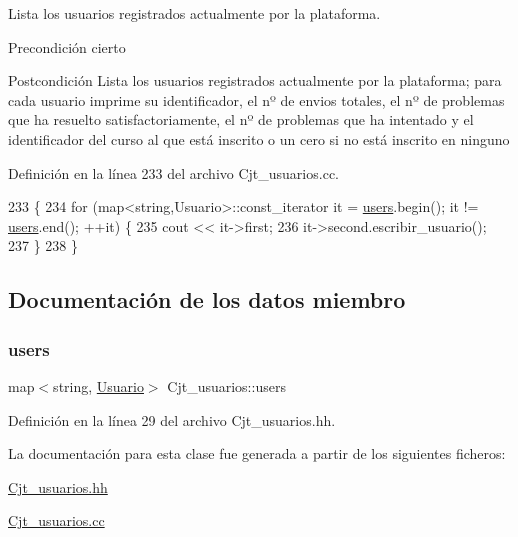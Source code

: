 Lista los usuarios registrados actualmente por la plataforma. 

\begin{DoxyPrecond}{Precondición}
cierto 
\end{DoxyPrecond}
\begin{DoxyPostcond}{Postcondición}
Lista los usuarios registrados actualmente por la plataforma; para cada usuario imprime su identificador, el nº de envios totales, el nº de problemas que ha resuelto satisfactoriamente, el nº de problemas que ha intentado y el identificador del curso al que está inscrito o un cero si no está inscrito en ninguno 
\end{DoxyPostcond}


Definición en la línea 233 del archivo Cjt\+\_\+usuarios.\+cc.


\begin{DoxyCode}
233                                                \{
234         \textcolor{keywordflow}{for} (map<string,Usuario>::const\_iterator it = \mbox{\hyperlink{class_cjt__usuarios_a0b702ca0184d6fb2674cc827d39d5bff}{users}}.begin(); it != 
      \mbox{\hyperlink{class_cjt__usuarios_a0b702ca0184d6fb2674cc827d39d5bff}{users}}.end(); ++it) \{
235           cout << it->first;
236           it->second.escribir\_usuario();
237         \}
238       \}
\end{DoxyCode}


\subsection{Documentación de los datos miembro}
\mbox{\label{class_cjt__usuarios_a0b702ca0184d6fb2674cc827d39d5bff}} 
\subsubsection{\texorpdfstring{users}{users}}
{\footnotesize\ttfamily map$<$string, \mbox{\hyperlink{class_usuario}{Usuario}}$>$ Cjt\+\_\+usuarios\+::users\hspace{0.3cm}{\ttfamily [private]}}



Definición en la línea 29 del archivo Cjt\+\_\+usuarios.\+hh.



La documentación para esta clase fue generada a partir de los siguientes ficheros\+:\begin{DoxyCompactItemize}
\item 
\mbox{\hyperlink{_cjt__usuarios_8hh}{Cjt\+\_\+usuarios.\+hh}}\item 
\mbox{\hyperlink{_cjt__usuarios_8cc}{Cjt\+\_\+usuarios.\+cc}}\end{DoxyCompactItemize}
